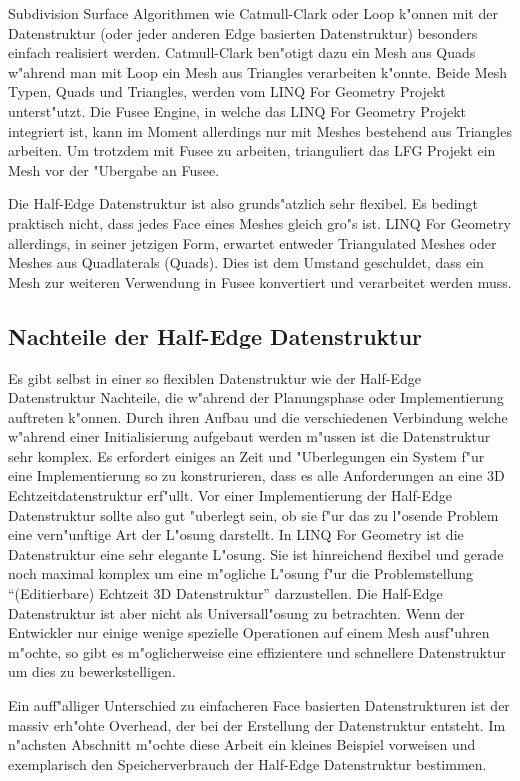 \documentclass[pagesize, paper=a4, fontsize=12pt,titlepage=true, headings=small, headnosepline, abstractoff, liststotoc, nochapterprefix, plainheadsepline]{scrreprt}
\newcommand{\LFGS}{LINQ For Geometry }
\newcommand{\HES}{Half-Edge Datenstruktur }
\begin{document}
Subdivision Surface Algorithmen wie Catmull-Clark oder Loop k"onnen mit der Datenstruktur (oder jeder anderen Edge basierten Datenstruktur) besonders einfach realisiert werden. Catmull-Clark ben"otigt dazu ein Mesh aus Quads w"ahrend man mit Loop ein Mesh aus Triangles verarbeiten k"onnte. Beide Mesh Typen, Quads und Triangles, werden vom \LFGS Projekt unterst"utzt. Die Fusee Engine, in welche das \LFGS Projekt integriert ist, kann im Moment allerdings nur mit Meshes bestehend aus Triangles arbeiten. Um trotzdem mit Fusee zu arbeiten, trianguliert das LFG Projekt ein Mesh vor der "Ubergabe an Fusee.

Die \HES ist also grunds"atzlich sehr flexibel. Es bedingt praktisch nicht, dass jedes Face eines Meshes gleich gro"s ist. \LFGS allerdings, in seiner jetzigen Form, erwartet entweder Triangulated Meshes oder Meshes aus Quadlaterals (Quads). Dies ist dem Umstand geschuldet, dass ein Mesh zur weiteren Verwendung in Fusee konvertiert und verarbeitet werden muss.
		\subsection {Nachteile der \HES}
Es gibt selbst in einer so flexiblen Datenstruktur wie der \HES Nachteile, die w"ahrend der Planungsphase oder Implementierung auftreten k"onnen.
			Durch ihren Aufbau und die verschiedenen Verbindung welche w"ahrend einer Initialisierung aufgebaut werden m"ussen ist die Datenstruktur sehr komplex. Es erfordert einiges an Zeit und "Uberlegungen ein System f"ur eine Implementierung so zu konstrurieren, dass es alle Anforderungen an eine 3D Echtzeitdatenstruktur erf"ullt. Vor einer Implementierung der \HES sollte also gut "uberlegt sein, ob sie f"ur das zu l"osende Problem eine vern"unftige Art der L"osung darstellt. In \LFGS ist die Datenstruktur eine sehr elegante L"osung. Sie ist hinreichend flexibel und gerade noch maximal komplex um eine m"ogliche L"osung f"ur die Problemstellung "`(Editierbare) Echtzeit 3D Datenstruktur"' darzustellen. Die \HES ist aber nicht als Universall"osung zu betrachten. Wenn der Entwickler nur einige wenige spezielle Operationen auf einem Mesh ausf"uhren m"ochte, so gibt es m"oglicherweise eine effizientere und schnellere Datenstruktur um dies zu bewerkstelligen.

Ein auff"alliger Unterschied zu einfacheren Face basierten Datenstrukturen ist der massiv erh"ohte Overhead, der bei der Erstellung der Datenstruktur entsteht. Im n"achsten Abschnitt m"ochte diese Arbeit ein kleines Beispiel vorweisen und exemplarisch den Speicherverbrauch der \HES bestimmen.
\end{document}
